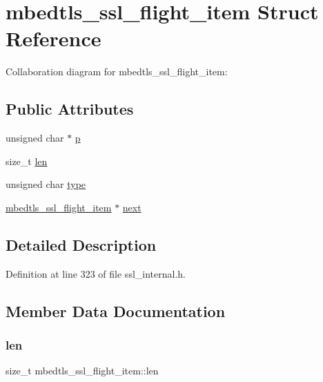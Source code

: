 \hypertarget{structmbedtls__ssl__flight__item}{}\section{mbedtls\+\_\+ssl\+\_\+flight\+\_\+item Struct Reference}
\label{structmbedtls__ssl__flight__item}


Collaboration diagram for mbedtls\+\_\+ssl\+\_\+flight\+\_\+item\+:
\subsection*{Public Attributes}
\begin{DoxyCompactItemize}
\item 
unsigned char $\ast$ \mbox{\hyperlink{structmbedtls__ssl__flight__item_aad7b11522ddc6f7ea383231b9e3cedf1}{p}}
\item 
size\+\_\+t \mbox{\hyperlink{structmbedtls__ssl__flight__item_a2a707163f2b8728b666071f1d7b120f9}{len}}
\item 
unsigned char \mbox{\hyperlink{structmbedtls__ssl__flight__item_acdfcb3e1d7848e7f09d9c00defa90e4b}{type}}
\item 
\mbox{\hyperlink{structmbedtls__ssl__flight__item}{mbedtls\+\_\+ssl\+\_\+flight\+\_\+item}} $\ast$ \mbox{\hyperlink{structmbedtls__ssl__flight__item_a10b26523d65d985a745e517312ca4ca1}{next}}
\end{DoxyCompactItemize}


\subsection{Detailed Description}


Definition at line 323 of file ssl\+\_\+internal.\+h.



\subsection{Member Data Documentation}
\mbox{\label{structmbedtls__ssl__flight__item_a2a707163f2b8728b666071f1d7b120f9}} 
\subsubsection{\texorpdfstring{len}{len}}
{\footnotesize\ttfamily size\+\_\+t mbedtls\+\_\+ssl\+\_\+flight\+\_\+item\+::len}

